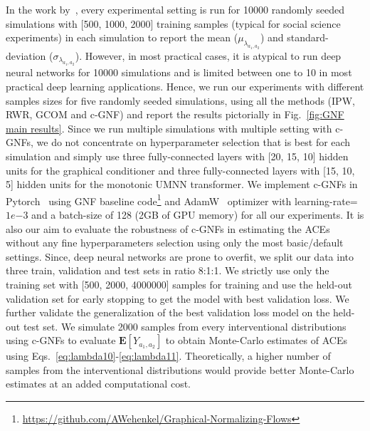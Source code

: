 \documentclass[letterpaper]{article} %
\begin{document}
In the work by~\citet{wodtke2020rwr}, every experimental setting is run for 10000 randomly seeded simulations with [500, 1000, 2000] training samples (typical for social science experiments) in each simulation to report the mean ($\mu_{\lambda_{a_1,a_2}}$) and standard-deviation ($\sigma_{\lambda_{a_1,a_2}}$).
However, in most practical cases, it is atypical to run deep neural networks for 10000 simulations and is limited between one to 10 in most practical deep learning applications. 
Hence, we run our experiments with different samples sizes for five randomly seeded simulations,
using all the methods (IPW, RWR, GCOM and c-GNF) and report the results pictorially in Fig.~\ref{fig:GNF main results}.
Since we run multiple simulations with multiple setting with c-GNFs, we do not concentrate on hyperparameter selection that is best for each simulation and simply use three fully-connected layers with [20, 15, 10] hidden units for the graphical conditioner and three fully-connected layers with [15, 10, 5] hidden units for the monotonic UMNN transformer.
We implement c-GNFs in Pytorch~\cite{paszke2017pytorch} using GNF baseline code\footnote{\url{https://github.com/AWehenkel/Graphical-Normalizing-Flows}} and AdamW~\cite{LoshchilovH2019adamw} optimizer with learning-rate=$1e{-3}$ and a batch-size of 128 (2GB of GPU memory) for all our experiments.
It is also our aim to evaluate the robustness of c-GNFs in estimating the ACEs without any fine hyperparameters selection using only the most basic/default settings.
Since, deep neural networks are prone to overfit, we split our data into three train, validation and test sets in ratio 8:1:1. We strictly use only the training set with [500, 2000, 4000000] samples for training and use the held-out validation set for early stopping to get the model with best validation loss. 
We further validate the generalization of the best validation loss model on the held-out test set.
We simulate 2000 samples from every interventional distributions using c-GNFs to evaluate $\mathbf{E}[Y_{a_1,a_2}]$ to obtain Monte-Carlo estimates of ACEs using Eqs.~\eqref{eq:lambda10}-\eqref{eq:lambda11}. Theoretically, a higher number of samples from the interventional distributions would provide better Monte-Carlo estimates at an added computational cost.
\end{document}
